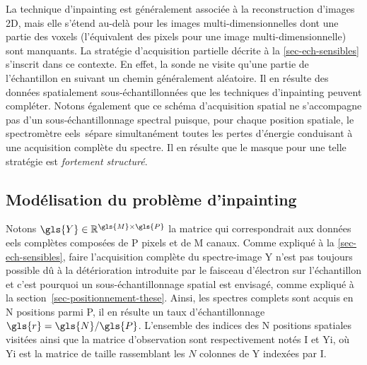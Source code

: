 La technique d'inpainting est généralement associée à la reconstruction d'images 2D, mais elle s'étend au-delà pour les images multi-dimensionnelles dont une partie des voxels (l'équivalent des pixels pour une image multi-dimensionnelle) sont manquants.
%
La stratégie d'acquisition partielle décrite à la \cref{sec-ech-sensibles} s'inscrit dans ce contexte. En effet, la sonde ne visite qu'une partie de l'échantillon en suivant un chemin généralement aléatoire. Il en résulte des données spatialement sous-échantillonnées que les techniques d'inpainting peuvent compléter.
%
Notons également que ce schéma d'acquisition spatial ne s'accompagne pas d'un sous-échantillonnage spectral puisque, pour chaque position spatiale, le spectromètre \gls{eels} sépare simultanément toutes les pertes d'énergie conduisant à une acquisition complète du spectre. Il en résulte que le masque pour une telle stratégie est \emph{fortement structuré}.


\subsection{Modélisation du problème d'inpainting}\label{subsec-direct-inverse-problem}

Notons $\gls{Y}\in\mathbb{R}^{\gls{M}\times\gls{P}}$ la matrice qui correspondrait aux données \gls{eels} complètes composées de \gls{P} pixels et de \gls{M} canaux. 
%
Comme expliqué à la \cref{sec-ech-sensibles}, faire l'acquisition complète du spectre-image \gls{Y} n'est pas toujours possible dû à la détérioration introduite par le faisceau d'électron sur l'échantillon et c'est pourquoi un sous-échantillonnage spatial est envisagé, comme expliqué à la section~\ref{sec-positionnement-these}.
%
Ainsi, les spectres complets sont acquis en \gls{N} positions parmi \gls{P}, il en résulte un taux d'échantillonnage $\gls{r}=\gls{N}/\gls{P}$. L'ensemble des indices des \gls{N} positions spatiales visitées ainsi que la matrice d'observation sont respectivement notés \gls{I} et \gls{Yi}, où \gls{Yi} est la matrice de taille  rassemblant les $N$ colonnes de \gls{Y} indexées par \gls{I}. %

